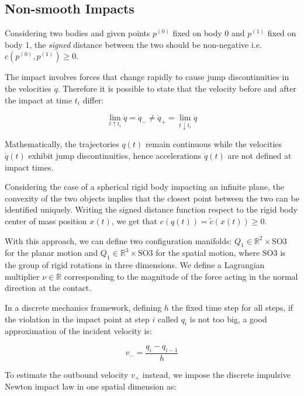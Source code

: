\subsection{Non-smooth Impacts}

Considering two bodies and given points $p ^{(0)}$ fixed on body 0 and $p ^{(1)}$ fixed on body 1, the \textit{signed} distance between the two should be non-negative i.e. $c(p ^{(0)}, p ^{(1)}) \geq 0$.

The impact involves forces that change rapidly to cause jump discontinuities in the velocities $\dot{q}$. Therefore it is possible to state that the velocity before and after the impact at time $t_i$ differ:

\begin{equation}
    \lim _{t \uparrow t _i} \dot{q} = \dot{q} _{-} \neq \dot{q} _{+} = \lim _{t \downarrow t _i} \dot{q}
\end{equation}

Mathematically, the trajectories $q(t)$ remain continuous while the velocities $\dot{q}(t)$ exhibit jump discontinuities, hence accelerations $\ddot{q}(t)$ are not defined at impact times.

Considering the case of a spherical rigid body impacting an infinite plane, the convexity of the two objects implies that the closest point between the two can be identified uniquely.
Writing the signed distance function respect to the rigid body center of mass position $x(t)$, we get that $c(q(t)) = \tilde{c}(x(t)) \geq 0$.

With this approach, we can define two configuration manifolds: $Q _1 \in \mathbb{R} ^2 \times \mathrm{SO}3$ for the planar motion and $Q _1 \in \mathbb{R} ^3 \times \mathrm{SO}3$ for the spatial motion, where $\mathrm{SO}3$ is the group of rigid rotations in three dimensions. We define a Lagrangian multiplier $\nu \in \mathbb{R}$ corresponding to the magnitude of the force acting in the normal direction at the contact.

In a discrete mechanics framework, defining $h$ the fixed time step for all steps, if the violation in the impact point at step $i$ called $q _i$ is not too big, a good approximation of the incident velocity is:

\begin{equation}
    v _{-} = \frac{q _i - q _{i-1}}{h}
\end{equation}

To estimate the outbound velocity $v _{+}$ instead, we impose the discrete impulsive Newton impact law in one spatial dimension as:

